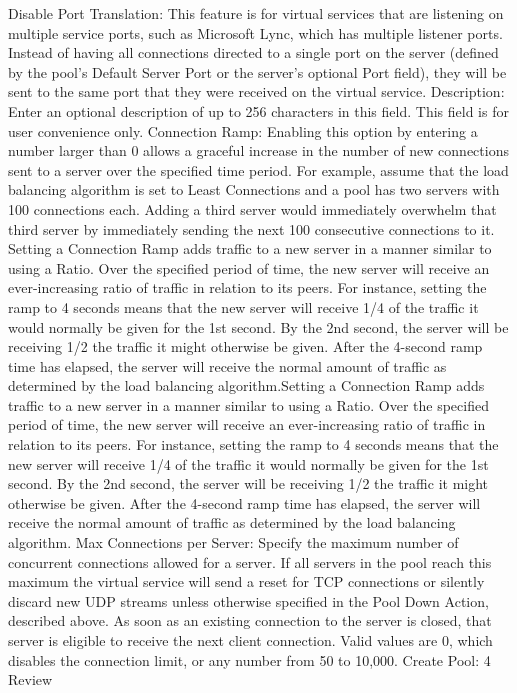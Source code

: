\documentclass[letterpaper,10pt,english]{sphinxmanual}
\begin{document}
Disable Port Translation: This feature is for virtual services that are listening on multiple service ports, such as Microsoft Lync, which has multiple listener ports. Instead of having all connections directed to a single port on the server (defined by the pool’s Default Server Port or the server’s optional Port field), they will be sent to the same port that they were received on the virtual service.
Description: Enter an optional description of up to 256 characters in this field. This field is for user convenience only.
Connection Ramp: Enabling this option by entering a number larger than 0 allows a graceful increase in the number of new connections sent to a server over the specified time period. For example, assume that the load balancing algorithm is set to Least Connections and a pool has two servers with 100 connections each. Adding a third server would immediately overwhelm that third server by immediately sending the next 100 consecutive connections to it. Setting a Connection Ramp adds traffic to a new server in a manner similar to using a Ratio. Over the specified period of time, the new server will receive an ever-increasing ratio of traffic in relation to its peers. For instance, setting the ramp to 4 seconds means that the new server will receive 1/4 of the traffic it would normally be given for the 1st second. By the 2nd second, the server will be receiving 1/2 the traffic it might otherwise be given. After the 4-second ramp time has elapsed, the server will receive the normal amount of traffic as determined by the load balancing algorithm.Setting a Connection Ramp adds traffic to a new server in a manner similar to using a Ratio. Over the specified period of time, the new server will receive an ever-increasing ratio of traffic in relation to its peers. For instance, setting the ramp to 4 seconds means that the new server will receive 1/4 of the traffic it would normally be given for the 1st second. By the 2nd second, the server will be receiving 1/2 the traffic it might otherwise be given. After the 4-second ramp time has elapsed, the server will receive the normal amount of traffic as determined by the load balancing algorithm.
Max Connections per Server: Specify the maximum number of concurrent connections allowed for a server. If all servers in the pool reach this maximum the virtual service will send a reset for TCP connections or silently discard new UDP streams unless otherwise specified in the Pool Down Action, described above. As soon as an existing connection to the server is closed, that server is eligible to receive the next client connection. Valid values are 0, which disables the connection limit, or any number from 50 to 10,000.
Create Pool: 4 Review
\end{document}
